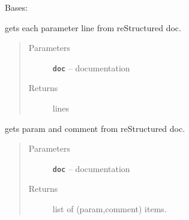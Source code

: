 \documentclass[letterpaper,10pt,english]{sphinxmanual}
\begin{document}
\begin{fulllineitems}
\label{RRtoolbox:RRtoolbox.shell.NoParserFound}
Bases: 

\end{fulllineitems}


\begin{fulllineitems}
\label{RRtoolbox:RRtoolbox.shell.getDocParamLines}
gets each parameter line from reStructured doc.
\begin{quote}\begin{description}
\item[{Parameters}] \leavevmode
\textbf{\texttt{doc}} -- documentation

\item[{Returns}] \leavevmode
lines

\end{description}\end{quote}

\end{fulllineitems}


\begin{fulllineitems}
\label{RRtoolbox:RRtoolbox.shell.getDocParameters}
gets param and comment from reStructured doc.
\begin{quote}\begin{description}
\item[{Parameters}] \leavevmode
\textbf{\texttt{doc}} -- documentation

\item[{Returns}] \leavevmode
list of (param,comment) items.

\end{description}\end{quote}

\end{fulllineitems}

\end{document}
